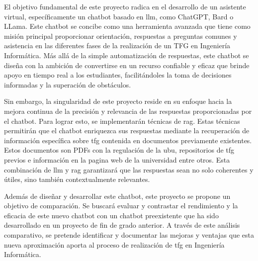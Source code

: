 
El objetivo fundamental de este proyecto radica en el desarrollo de un asistente virtual, específicamente un chatbot basado en \acrfull{llm}, como ChatGPT, Bard o LLama. Este chatbot se concibe como una herramienta avanzada que tiene como misión principal proporcionar orientación, respuestas a preguntas comunes y asistencia en las diferentes fases de la realización de un TFG en Ingeniería Informática. Más allá de la simple automatización de respuestas, este chatbot se diseña con la ambición de convertirse en un recurso confiable y eficaz que brinde apoyo en tiempo real a los estudiantes, facilitándoles la toma de decisiones informadas y la superación de obstáculos.

Sin embargo, la singularidad de este proyecto reside en su enfoque hacia la mejora continua de la precisión y relevancia de las respuestas proporcionadas por el chatbot. Para lograr esto, se implementarán técnicas de \acrfull{rag}. Estas técnicas permitirán que el chatbot enriquezca sus respuestas mediante la recuperación de información específica sobre \acrshort{tfg} contenida en documentos previamente existentes. Estos documentos son PDFs con la regulación de la \acrshort{ubu}, repositorios de \acrshort{tfg} previos e información en la pagina web de la universidad entre otros. Esta combinación de \acrshort{llm} y \acrshort{rag} garantizará que las respuestas sean no solo coherentes y útiles, sino también contextualmente relevantes.

Además de diseñar y desarrollar este chatbot, este proyecto se propone un objetivo de comparación. Se buscará evaluar y contrastar el rendimiento y la eficacia de este nuevo chatbot con un chatbot preexistente que ha sido desarrollado en un proyecto de fin de grado anterior. A través de este análisis comparativo, se pretende identificar y documentar las mejoras y ventajas que esta nueva aproximación aporta al proceso de realización de \acrshort{tfg} en Ingeniería Informática.

